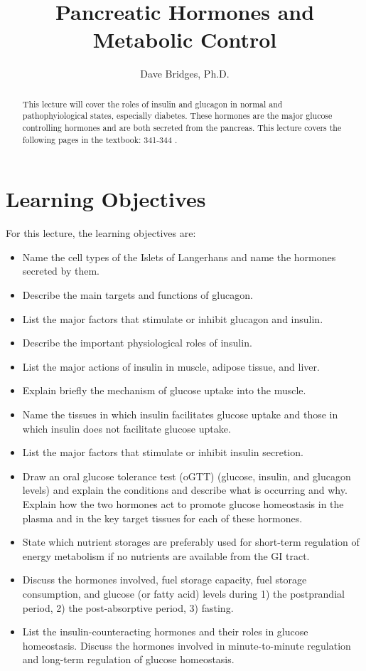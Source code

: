 \documentclass{tufte-handout}
\title{Pancreatic Hormones and Metabolic Control}
\author{Dave Bridges, Ph.D.}
\begin{document}
\maketitle%

\begin{abstract}
\noindent This lecture will cover the roles of insulin and glucagon in normal and pathophyiological states, especially diabetes.  These hormones are the major glucose controlling hormones and are both secreted from the pancreas.  This lecture covers the following pages in the textbook: 341-344 \cite{Widmaier2013}.  
\end{abstract}

\tableofcontents

\pagebreak

\section{Learning Objectives}
For this lecture, the learning objectives are:
\begin{itemize}
\item Name the cell types of the Islets of Langerhans and name the hormones secreted by them.
\item Describe the main targets and functions of glucagon.
\item List the major factors that stimulate or inhibit glucagon and insulin.
\item Describe the important physiological roles of insulin.
\item List the major actions of insulin in muscle, adipose tissue, and liver.
\item Explain briefly the mechanism of glucose uptake into the muscle.
\item Name the tissues in which insulin facilitates glucose uptake and those in which insulin does not facilitate glucose uptake.
\item List the major factors that stimulate or inhibit insulin secretion.
\item Draw an oral glucose tolerance test (oGTT)  (glucose, insulin, and glucagon levels) and explain the conditions and describe what is occurring and why.  Explain how the two hormones act to promote glucose homeostasis in the plasma and in the key target tissues for each of these hormones.
\item State which nutrient storages are preferably used for short-term regulation of energy metabolism if no nutrients are available from the GI tract.
\item Discuss the hormones involved, fuel storage capacity, fuel storage consumption, and glucose (or fatty acid) levels during 1) the postprandial period, 2) the post-absorptive period, 3) fasting.
\item List the insulin-counteracting hormones and their roles in glucose homeostasis. Discuss the hormones involved in minute-to-minute regulation and long-term regulation of glucose homeostasis.

\end{itemize}
\end{document}
